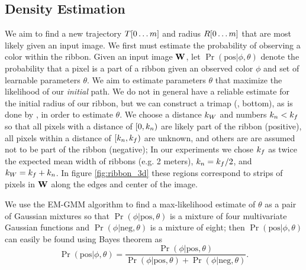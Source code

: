 \subsection{Density Estimation}
We aim to find a new trajectory $T{[0\dots m]}$ and radius $R{[0\dots m]}$ that are most likely given an input image. We first must estimate the probability of observing a color within the ribbon.  
Given an input image $\mathbf{W}{}$, let $\Pr(\text{pos}|\phi,\theta)$ denote the probability that a pixel is a part of a ribbon given an observed color $\phi$ and set of learnable parameters $\theta$. 
We aim to estimate parameters $\theta$ that maximize the likelihood of our \textit{initial} path. 
We do not in general have a reliable estimate for the initial radius of our ribbon, 
but we can construct a trimap (, bottom), as is done by \GrabCut{}, in order to estimate $\theta$. We choose a distance $k_W$ and numbers $k_n < k_f$ 
so that all pixels with a distance of $[0, k_n)$ are likely part of the ribbon (positive), all pixels within a distance of $[k_n, k_f)$ are unknown, and others are are assumed not to be part of the ribbon (negative); 
In our experiments we chose  $k_f$ as twice the expected mean width of ribbons (e.g. 2 meters), $k_n = k_f/2$, and $k_W=k_f+k_n$.  
In figure \ref{fig:ribbon_3d} these regions correspond to strips of pixels in $\mathbf{W}{}$ along the edges and center of the image.


We use the \ac{EM-GMM} algorithm to find a max-likelihood estimate of $\theta$ as a pair of Gaussian mixtures so that $\Pr(\phi|\text{pos}, \theta)$ is a mixture of four multivariate Gaussian functions and $\Pr(\phi|\text{neg}, \theta)$ is a mixture of eight; then $\Pr(\text{pos}|\phi, \theta)$ can easily be found using Bayes theorem as 
$$\Pr(\text{pos}|\phi, \theta)= \frac{\Pr(\phi|\text{pos}, \theta)}{\Pr(\phi|\text{pos}, \theta)+\Pr(\phi|\text{neg}, \theta)}.$$



